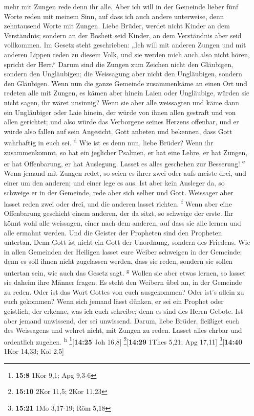 mehr mit Zungen rede denn ihr alle.  Aber ich will in der
Gemeinde lieber fünf Worte reden mit meinem Sinn, auf dass ich auch
andere unterweise, denn zehntausend Worte mit Zungen. 
Liebe Brüder, werdet nicht Kinder an dem Verständnis; sondern an der
Bosheit seid Kinder, an dem Verständnis aber seid vollkommen.
 Im Gesetz steht geschrieben: „Ich will mit anderen
Zungen und mit anderen Lippen reden zu diesem Volk, und sie werden mich
auch also nicht hören, spricht der Herr.``  Darum sind
die Zungen zum Zeichen nicht den Gläubigen, sondern den Ungläubigen; die
Weissagung aber nicht den Ungläubigen, sondern den Gläubigen.
 Wenn nun die ganze Gemeinde zusammenkäme an einen Ort
und redeten alle mit Zungen, es kämen aber hinein Laien oder Ungläubige,
würden sie nicht sagen, ihr wäret unsinnig?  Wenn sie
aber alle weissagten und käme dann ein Ungläubiger oder Laie hinein, der
würde von ihnen allen gestraft und von allen gerichtet; 
und also würde das Verborgene seines Herzens offenbar, und er würde also
fallen auf sein Angesicht, Gott anbeten und bekennen, dass Gott
wahrhaftig in euch sei. \textsuperscript{d}  Wie ist es
denn nun, liebe Brüder? Wenn ihr zusammenkommt, so hat ein jeglicher
Psalmen, er hat eine Lehre, er hat Zungen, er hat Offenbarung, er hat
Auslegung. Lasset es alles geschehen zur Besserung! \textsuperscript{e}
 Wenn jemand mit Zungen redet, so seien es ihrer zwei
oder aufs meiste drei, und einer um den anderen; und einer lege es aus.
 Ist aber kein Ausleger da, so schweige er in der
Gemeinde, rede aber sich selber und Gott.  Weissager aber
lasset reden zwei oder drei, und die anderen lasset richten.
\textsuperscript{f}  Wenn aber eine Offenbarung geschieht
einem anderen, der da sitzt, so schweige der erste.  Ihr
könnt wohl alle weissagen, einer nach dem anderen, auf dass sie alle
lernen und alle ermahnt werden.  Und die Geister der
Propheten sind den Propheten untertan.  Denn Gott ist
nicht ein Gott der Unordnung, sondern des Friedens.  Wie
in allen Gemeinden der Heiligen lasset eure Weiber schweigen in der
Gemeinde; denn es soll ihnen nicht zugelassen werden, dass sie reden,
sondern sie sollen untertan sein, wie auch das Gesetz sagt.
\textsuperscript{g}  Wollen sie aber etwas lernen, so
lasset sie daheim ihre Männer fragen. Es steht den Weibern übel an, in
der Gemeinde zu reden.  Oder ist das Wort Gottes von euch
ausgekommen? Oder ist's allein zu euch gekommen?  Wenn
sich jemand lässt dünken, er sei ein Prophet oder geistlich, der
erkenne, was ich euch schreibe; denn es sind des Herrn Gebote.
 Ist aber jemand unwissend, der sei unwissend.
 Darum, liebe Brüder, fleißiget euch des Weissagens und
wehret nicht, mit Zungen zu reden.  Lasset alles ehrbar
und ordentlich zugehen. \textsuperscript{h} \footnote{\textbf{15:8} 1Kor
  9,1; Apg 9,3-6}{[}\textbf{14:25} Joh 16,8{]}
\footnote{\textbf{15:10} 2Kor 11,5; 2Kor 11,23}{[}\textbf{14:29} 1Thes
5,21; Apg 17,11{]} \footnote{\textbf{15:21} 1Mo 3,17-19; Röm 5,18}{[}\textbf{14:40}
1Kor 14,33; Kol 2,5{]}

